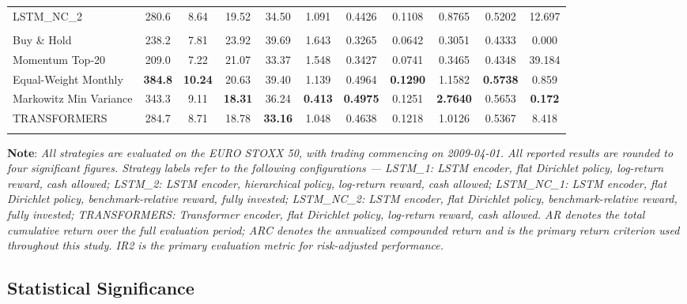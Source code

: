 \documentclass[]{elsarticle}
\begin{document}
\begin{table}[htbp]
{\begin{tabular}{lcccccccccc}
LSTM\_NC\_2 & 280.6 & 8.64 & 19.52 & 34.50 & 1.091 & 0.4426 & 0.1108 & 0.8765 & 0.5202 & 12.697 \\
\addlinespace
\multicolumn{11}{l}{\textbf{Panel C: RL with Transformers}} \\
\midrule
Buy \& Hold & 238.2 & 7.81 & 23.92 & 39.69 & 1.643 & 0.3265 & 0.0642 & 0.3051 & 0.4333 & 0.000 \\
Momentum Top-20 & 209.0 & 7.22 & 21.07 & 33.37 & 1.548 & 0.3427 & 0.0741 & 0.3465 & 0.4348 & 39.184 \\
Equal-Weight Monthly & \textbf{384.8} & \textbf{10.24} & 20.63 & 39.40 & 1.139 & 0.4964 & \textbf{0.1290} & 1.1582 & \textbf{0.5738} & 0.859 \\
Markowitz Min Variance & 343.3 & 9.11 & \textbf{18.31} & 36.24 & \textbf{0.413} & \textbf{0.4975} & 0.1251 & \textbf{2.7640} & 0.5653 & \textbf{0.172} \\
TRANSFORMERS & 284.7 & 8.71 & 18.78 & \textbf{33.16} & 1.048 & 0.4638 & 0.1218 & 1.0126 & 0.5367 & 8.418 \\
\addlinespace
\bottomrule
\end{tabular}%
}
\end{table}

\vspace{-0.4cm}
\noindent\linespread{0.65}\selectfont
{\scriptsize \textbf{Note}: \textit{All strategies are evaluated on the EURO STOXX 50, with trading commencing on 2009-04-01. All reported results are rounded to four significant figures. Strategy labels refer to the following configurations --- LSTM\_1: LSTM encoder, flat Dirichlet policy, log-return reward, cash allowed; LSTM\_2: LSTM encoder, hierarchical policy, log-return reward, cash allowed; LSTM\_NC\_1: LSTM encoder, flat Dirichlet policy, benchmark-relative reward, fully invested; LSTM\_NC\_2: LSTM encoder, flat Dirichlet policy, benchmark-relative reward, fully invested; TRANSFORMERS: Transformer encoder, flat Dirichlet policy, log-return reward, cash allowed. AR denotes the total cumulative return over the full evaluation period; ARC denotes the annualized compounded return and is the primary return criterion used throughout this study. IR2 is the primary evaluation metric for risk-adjusted performance.}}

\linespread{1.5}\selectfont

\hypertarget{er_statistical_significance}{%
\subsection{Statistical Significance}\label{er_statistical_significance}}
\end{document}
